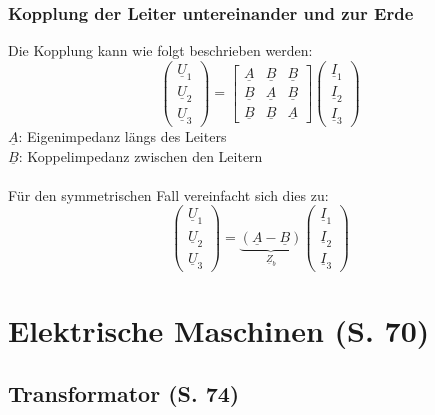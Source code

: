 \documentclass[a4paper,twocolumn,10pt]{article}
\begin{document}
\subsubsection{Kopplung der Leiter untereinander und zur Erde}
Die Kopplung kann wie folgt beschrieben werden:
\begin{equation*}
\begin{pmatrix}\underline{U}_1 \\ \underline{U}_2 \\ \underline{U}_3\end{pmatrix}=\begin{bmatrix}\underline{A} & \underline{B} & \underline{B} \\ \underline{B} & \underline{A} & \underline{B} \\ \underline{B} & \underline{B} & \underline{A}\end{bmatrix}\begin{pmatrix}\underline{I}_1 \\ \underline{I}_2 \\ \underline{I}_3\end{pmatrix}
\end{equation*}
$\underline{A}$: Eigenimpedanz längs des Leiters\\
$\underline{B}$: Koppelimpedanz zwischen den Leitern\\\\
Für den symmetrischen Fall vereinfacht sich dies zu:
\begin{equation*}
\begin{pmatrix}\underline{U}_1 \\ \underline{U}_2 \\ \underline{U}_3\end{pmatrix}=\underbrace{(\underline{A}-\underline{B})}_{\underline{Z}_b}\begin{pmatrix}\underline{I}_1 \\ \underline{I}_2 \\ \underline{I}_3\end{pmatrix}
\end{equation*}

\newpage
\section{Elektrische Maschinen (S. 70)}

\subsection{Transformator (S. 74)}
\end{document}
